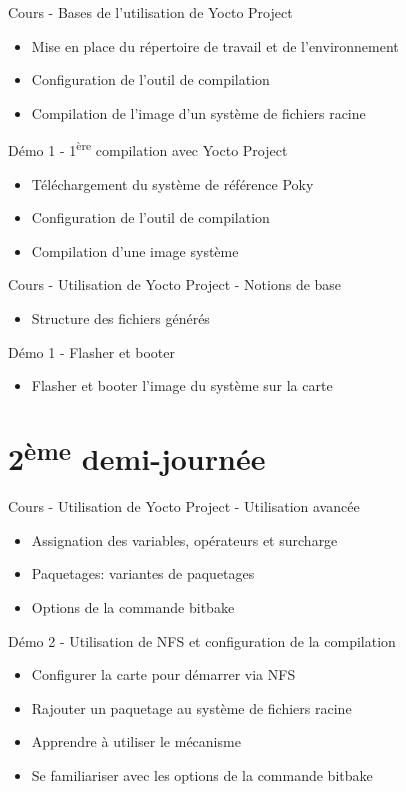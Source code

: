 \documentclass[a4paper,12pt,obeyspaces,spaces,hyphens]{article}
\begin{document}
\feagendatwocolumn
{Cours - Bases de l'utilisation de Yocto Project}
{
  \begin{itemize}
  \item Mise en place du répertoire de travail et de l'environnement
  \item Configuration de l'outil de compilation
  \item Compilation de l'image d'un système de fichiers racine
  \end{itemize}
}
{Démo 1 - 1\textsuperscript{ère} compilation avec Yocto Project}
{
  \begin{itemize}
  \item Téléchargement du système de référence Poky
  \item Configuration de l'outil de compilation
  \item Compilation d'une image système
 \end{itemize}
}

\feagendatwocolumn
{Cours - Utilisation de Yocto Project - Notions de base}
{
  \begin{itemize}
  \item Structure des fichiers générés
  \end{itemize}
}
{Démo 1 - Flasher et booter}
{
  \begin{itemize}
  \item Flasher et booter l'image du système sur la carte
  \end{itemize}
}

\section{2\textsuperscript{ème} demi-journée}

\feagendatwocolumn
{Cours - Utilisation de Yocto Project - Utilisation avancée}
{
  \begin{itemize}
  \item Assignation des variables, opérateurs et surcharge
  \item Paquetages: variantes de paquetages
  \item Options de la commande bitbake
  \end{itemize}
}
{Démo 2 - Utilisation de NFS et configuration de la compilation}
{
  \begin{itemize}
  \item Configurer la carte pour démarrer via NFS
  \item Rajouter un paquetage au système de fichiers racine
  \item Apprendre à utiliser le mécanisme 
  \item Se familiariser avec les options de la commande bitbake
  \end{itemize}
}
\\
\end{document}
